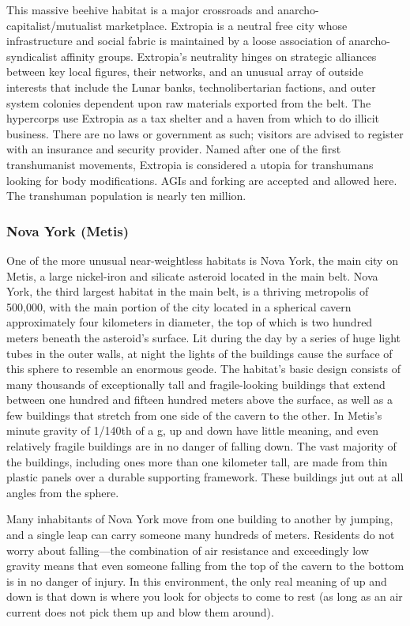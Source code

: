 This massive beehive habitat is a major crossroads 
and anarcho-capitalist/mutualist marketplace. Extropia is a neutral free city whose infrastructure and 
social fabric is maintained by a loose association of 
anarcho-syndicalist affinity groups. Extropia's neutrality hinges on strategic alliances between key local 
figures, their networks, and an unusual array of outside interests that include the Lunar banks, technolibertarian factions, and outer system colonies dependent upon raw materials exported from the belt. The 
hypercorps use Extropia as a tax shelter and a haven 
from which to do illicit business. There are no laws 
or government as such; visitors are advised to register 
with an insurance and security provider. Named after 
one of the first transhumanist movements, Extropia 
is considered a utopia for transhumans looking for 
body modifications. AGIs and forking are accepted 
and allowed here. The transhuman population is 
nearly ten million.

\subsubsection{Nova York (Metis)}

One of the more unusual near-weightless habitats is 
Nova York, the main city on Metis, a large nickel-iron 
and silicate asteroid located in the main belt. Nova 
York, the third largest habitat in the main belt, is a 
thriving metropolis of 500,000, with the main portion 
of the city located in a spherical cavern approximately 
four kilometers in diameter, the top of which is two 
hundred meters beneath the asteroid's surface. Lit 
during the day by a series of huge light tubes in the 
outer walls, at night the lights of the buildings cause 
the surface of this sphere to resemble an enormous 
geode. The habitat's basic design consists of many 
thousands of exceptionally tall and fragile-looking 
buildings that extend between one hundred and fifteen 
hundred meters above the surface, as well as a few 
buildings that stretch from one side of the cavern to 
the other. In Metis's minute gravity of 1/140th of a g, 
up and down have little meaning, and even relatively 
fragile buildings are in no danger of falling down. The 
vast majority of the buildings, including ones more 
than one kilometer tall, are made from thin plastic 
panels over a durable supporting framework. These 
buildings jut out at all angles from the sphere.

Many inhabitants of Nova York move from one 
building to another by jumping, and a single leap can 
carry someone many hundreds of meters. Residents 
do not worry about falling—the combination of air 
resistance and exceedingly low gravity means that 
even someone falling from the top of the cavern to 
the bottom is in no danger of injury. In this environment, the only real meaning of up and down is that 
down is where you look for objects to come to rest 
(as long as an air current does not pick them up and 
blow them around).

